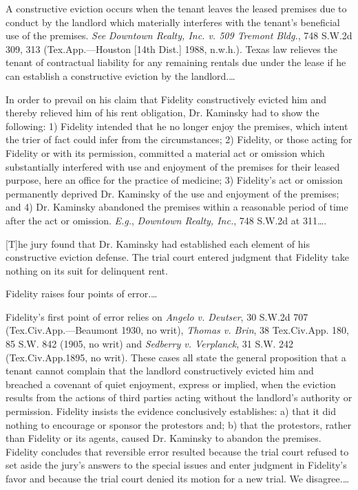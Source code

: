 A constructive eviction occurs when the tenant leaves the leased premises due to
conduct by the landlord which materially interferes with the tenant's
beneficial use of the premises. \textit{See} \textit{Downtown Realty, Inc. v.
509 Tremont Bldg.}, 748 S.W.2d 309, 313 (Tex.App.---Houston [14th Dist.] 1988,
n.w.h.). Texas law relieves the tenant of contractual liability for any
remaining rentals due under the lease if he can establish a constructive
eviction by the landlord.\ldots

In order to prevail on his claim that Fidelity constructively evicted him and
thereby relieved him of his rent obligation, Dr. Kaminsky had to show the
following: 1) Fidelity intended that he no longer enjoy the premises, which
intent the trier of fact could infer from the circumstances; 2) Fidelity, or
those acting for Fidelity or with its permission, committed a material act or
omission which substantially interfered with use and enjoyment of the premises
for their leased purpose, here an office for the practice of medicine; 3)
Fidelity's act or omission permanently deprived Dr. Kaminsky of the use and
enjoyment of the premises; and 4) Dr. Kaminsky abandoned the premises within a
reasonable period of time after the act or omission. \textit{E.g.},
\textit{Downtown Realty, Inc.}, 748 S.W.2d at 311\ldots.

[T]he jury found that Dr. Kaminsky had established each element of his
constructive eviction defense. The trial court entered judgment that Fidelity
take nothing on its suit for delinquent rent.

Fidelity raises four points of error.\ldots 

Fidelity's first point of error relies on \textit{Angelo v. Deutser}, 30 S.W.2d
707 (Tex.Civ.App.---Beaumont 1930, no writ), \textit{Thomas v. Brin}, 38
Tex.Civ.App. 180, 85 S.W. 842 (1905, no writ) and \textit{Sedberry v.
Verplanck}, 31 S.W. 242 (Tex.Civ.App.1895, no writ). These cases all state the
general proposition that a tenant cannot complain that the landlord
constructively evicted him and breached a covenant of quiet enjoyment, express
or implied, when the eviction results from the actions of third parties acting
without the landlord's authority or permission. Fidelity insists the evidence
conclusively establishes: a) that it did nothing to encourage or sponsor the
protestors and; b) that the protestors, rather than Fidelity or its agents,
caused Dr. Kaminsky to abandon the premises. Fidelity concludes that reversible
error resulted because the trial court refused to set aside the jury's answers
to the special issues and enter judgment in Fidelity's favor and because the
trial court denied its motion for a new trial. We disagree.\ldots 

